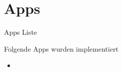 \section{Apps}



\begin{frame}{Apps Liste}
    \begin{Large}
        Folgende Apps wurden implementiert
    \end{Large}
    \vspace{15pt}

    \begin{itemize}
        \item 
    \end{itemize}
    
\end{frame}

